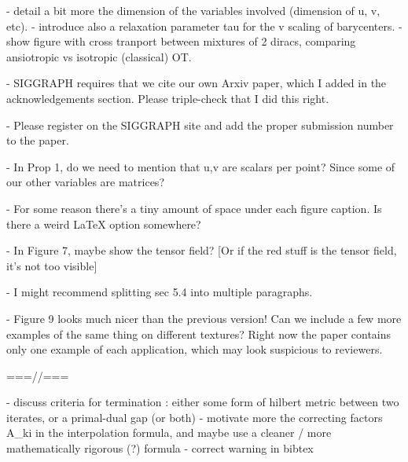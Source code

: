 
- detail a bit more the dimension of the variables involved (dimension of u, v, etc).
- introduce also a relaxation parameter tau for the v scaling of barycenters.
- show figure with cross tranport between mixtures of 2 diracs, comparing ansiotropic vs isotropic (classical) OT. 


- SIGGRAPH requires that we cite our own Arxiv paper, which I added in the acknowledgements section.  Please triple-check that I did this right.

- Please register on the SIGGRAPH site and add the proper submission number to the paper.

- In Prop 1, do we need to mention that u,v are scalars per point?  Since some of our other variables are matrices?

- For some reason there's a tiny amount of space under each figure caption.  Is there a weird LaTeX option somewhere?

- In Figure 7, maybe show the tensor field?  [Or if the red stuff is the tensor field, it's not too visible]

- I might recommend splitting sec 5.4 into multiple paragraphs.

- Figure 9 looks much nicer than the previous version!  Can we include a few more examples of the same thing on different textures?  Right now the paper contains only one example of each application, which may look suspicious to reviewers.


===//===

- discuss criteria for termination : either some form of hilbert metric between two iterates, or a primal-dual gap (or both)
- motivate more the correcting factors A_ki in the interpolation formula, and maybe use a cleaner / more mathematically rigorous (?) formula 
- correct warning in bibtex